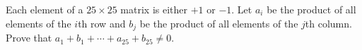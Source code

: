 Each element of a $25 \times 25$ matrix is either $+1$ or $-1$. Let $a_i$ be the product of all elements of the $i$th row and $b_j$ be the product of all elements of the $j$th column. Prove that $a_1 + b_1 + \cdots + a_{25} + b_{25} \neq 0$.
